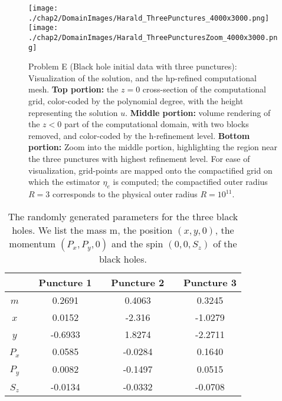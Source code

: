 \begin{figure}
  \texttt{[image: ./chap2/DomainImages/Harald\_ThreePunctures\_4000x3000.png]}
  \\
\texttt{[image: ./chap2/DomainImages/Harald\_ThreePuncturesZoom\_4000x3000.png]}

  \caption{Problem E (Black hole initial data with three punctures):
    Visualization of the solution, and the hp-refined computational
    mesh.  {\bf Top portion:} the $z=0$ cross-section of the
    computational grid, color-coded by the polynomial degree, with the
    height representing the solution $u$.  {\bf Middle portion:}
    volume rendering of the $z<0$ part of the computational domain,
    with two blocks removed, and color-coded by the
    h-refinement level.  {\bf Bottom portion:} Zoom into the middle
    portion, highlighting the region near the three punctures with
    highest refinement level. For ease of visualization, grid-points are mapped onto the compactified grid on which the estimator $\eta_e$ is computed; the compactified outer radius $R=3$ corresponds to the physical outer radius $R=10^{11}$. }
  \label{fig:Two_Punctures_Mesh_Final}
\end{figure}

\begin{table}
\centering
\label{tab:Multi_Punctures}
\begin{tabular}{cccc}
\hline
 \,\,\,\, & Puncture 1  \,\,\,\, & Puncture 2  \,\,\,\, & Puncture 3 \\ \hline
  $m$ \,\,\,\, &0.2691  \,\,\,\, & 0.4063  \,\,\,\, & 0.3245  \\
  $x$ \,\,\,\, &0.0152  \,\,\,\, & -2.316  \,\,\,\, & -1.0279  \\
  $y$ \,\,\,\, &-0.6933  \,\,\,\, & 1.8274  \,\,\,\, &  -2.2711  \\ 
  $P_x$ \,\,\,\, &0.0585  \,\,\,\, & -0.0284  \,\,\,\, &  0.1640 \\
  $P_y$ \,\,\,\, &0.0082  \,\,\,\, &  -0.1497 \,\,\,\, &  0.0515 \\
  $S_z$ \,\,\,\, &-0.0134  \,\,\,\, &  -0.0332  \,\,\,\, & -0.0708 \\ \hline
\end{tabular}
\caption{
  The randomly generated parameters for the three black holes.  We list the mass m, the position $(x,y,0)$, the momentum $(P_x, P_y, 0)$ and the spin $(0,0,S_z)$ of the black holes.
}
\end{table}

